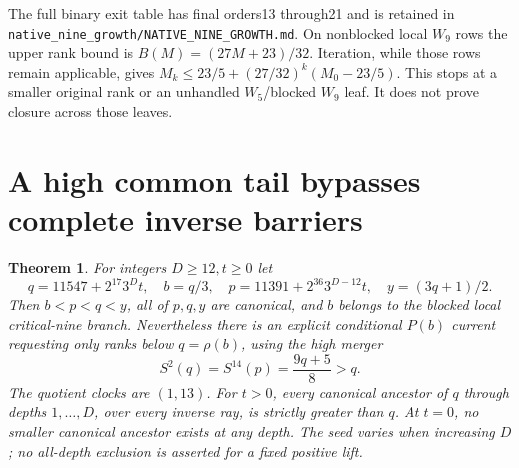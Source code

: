 \documentclass[11pt]{article}
\newtheorem{theorem}{Theorem}
\begin{document}
The full binary exit table has final orders13 through21 and is
retained in \texttt{native\_nine\_growth/NATIVE\_NINE\_GROWTH.md}.
On nonblocked local $W_9$ rows the upper rank bound is
$B(M)=(27M+23)/32$. Iteration, while those rows remain applicable,
gives $M_k\le23/5+(27/32)^k(M_0-23/5)$.
This stops at a smaller original rank or an unhandled $W_5$/blocked
$W_9$ leaf. It does not prove closure across those leaves.

\section{A high common tail bypasses complete inverse barriers}
\begin{theorem}\label{thm:nativehistory}
For integers $D\ge12,t\ge0$ let
\[
 q=11547+2^{17}3^Dt,\quad b=q/3,\quad
 p=11391+2^{36}3^{D-12}t,\quad y=(3q+1)/2.
\]
Then $b<p<q<y$, all of $p,q,y$ are canonical, and $b$ belongs
to the blocked local critical-nine branch. Nevertheless there is
an explicit conditional $P(b)$ current requesting only ranks below
$q=\rho(b)$, using the high merger
\[
 S^2(q)=S^{14}(p)=\frac{9q+5}{8}>q.
 \tag{NH1}
\]
The quotient clocks are $(1,13)$.
For $t>0$, every canonical ancestor of $q$ through depths
$1,\ldots,D$, over every inverse ray, is strictly greater than $q$.
At $t=0$, no smaller canonical ancestor exists at any depth.
The seed varies when increasing $D$; no all-depth exclusion is
asserted for a fixed positive lift.
\end{theorem}
\end{document}
